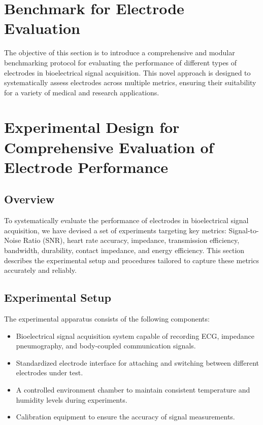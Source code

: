\section{Benchmark for Electrode Evaluation}


The objective of this section is to introduce a comprehensive and modular benchmarking protocol for evaluating the performance of different types of electrodes in bioelectrical signal acquisition. This novel approach is designed to systematically assess electrodes across multiple metrics, ensuring their suitability for a variety of medical and research applications.

\section{Experimental Design for Comprehensive Evaluation of Electrode Performance}

\subsection{Overview}
To systematically evaluate the performance of electrodes in bioelectrical signal acquisition, we have devised a set of experiments targeting key metrics: Signal-to-Noise Ratio (SNR), heart rate accuracy, impedance, transmission efficiency, bandwidth, durability, contact impedance, and energy efficiency. This section describes the experimental setup and procedures tailored to capture these metrics accurately and reliably.

\subsection{Experimental Setup}
The experimental apparatus consists of the following components:
\begin{itemize}
    \item Bioelectrical signal acquisition system capable of recording ECG, impedance pneumography, and body-coupled communication signals.
    \item Standardized electrode interface for attaching and switching between different electrodes under test.
    \item A controlled environment chamber to maintain consistent temperature and humidity levels during experiments.
    \item Calibration equipment to ensure the accuracy of signal measurements.
\end{itemize}

